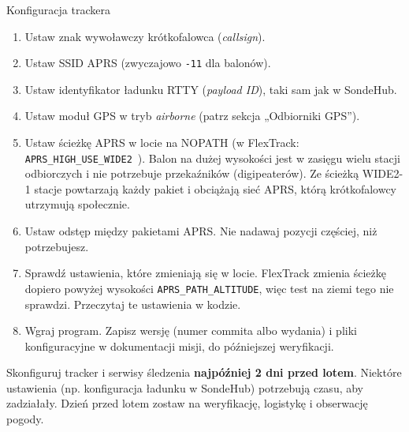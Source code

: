 \begin{sekcja}{Konfiguracja trackera}\label{sec:konfiguracja-trackera}
\begin{enumerate}
  \item Ustaw znak wywoławczy krótkofalowca (\emph{callsign}).
  \item Ustaw SSID APRS (zwyczajowo \texttt{-11} dla balonów).
  \item Ustaw identyfikator ładunku RTTY (\emph{payload ID}), taki sam jak w SondeHub.
  \item Ustaw moduł GPS w tryb \emph{airborne} (patrz sekcja „Odbiorniki GPS”).
  \item Ustaw ścieżkę APRS w locie na NOPATH (w FlexTrack: \texttt{APRS\_HIGH\_USE\_WIDE2}~\cite{flextrackpr}). Balon na dużej wysokości jest w zasięgu wielu stacji odbiorczych i nie potrzebuje przekaźników (digipeaterów). Ze ścieżką WIDE2-1 stacje powtarzają każdy pakiet i obciążają sieć APRS, którą krótkofalowcy utrzymują społecznie.
  \item Ustaw odstęp między pakietami APRS. Nie nadawaj pozycji częściej, niż potrzebujesz.
  \item Sprawdź ustawienia, które zmieniają się w locie. FlexTrack zmienia ścieżkę dopiero powyżej wysokości \texttt{APRS\_PATH\_ALTITUDE}, więc test na ziemi tego nie sprawdzi. Przeczytaj te ustawienia w kodzie.
  \item Wgraj program. Zapisz wersję (numer commita albo wydania) i pliki konfiguracyjne w dokumentacji misji, do późniejszej weryfikacji.
\end{enumerate}

\begin{uwaga}Skonfiguruj tracker i serwisy śledzenia \textbf{najpóźniej 2 dni przed lotem}. Niektóre ustawienia (np. konfiguracja ładunku w SondeHub) potrzebują czasu, aby zadziałały. Dzień przed lotem zostaw na weryfikację, logistykę i obserwację pogody.\end{uwaga}
\end{sekcja}

